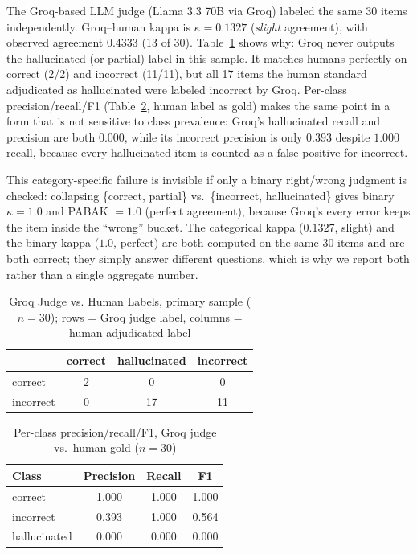 \documentclass[conference]{IEEEtran}
\begin{document}
The Groq-based LLM judge (Llama 3.3 70B via Groq) labeled the same 30 items independently. Groq--human kappa is $\kappa=0.1327$ (\emph{slight} agreement), with observed agreement $0.4333$ (13 of 30). Table~\ref{tab:confusion-groq30} shows why: Groq never outputs the hallucinated (or partial) label in this sample. It matches humans perfectly on correct (2/2) and incorrect (11/11), but all 17 items the human standard adjudicated as hallucinated were labeled incorrect by Groq. Per-class precision/recall/F1 (Table~\ref{tab:prf-groq30}, human label as gold) makes the same point in a form that is not sensitive to class prevalence: Groq's hallucinated recall and precision are both $0.000$, while its incorrect precision is only $0.393$ despite $1.000$ recall, because every hallucinated item is counted as a false positive for incorrect.

This category-specific failure is invisible if only a binary right/wrong judgment is checked: collapsing \{correct, partial\} vs.\ \{incorrect, hallucinated\} gives binary $\kappa=1.0$ and PABAK $=1.0$ (perfect agreement), because Groq's every error keeps the item inside the ``wrong'' bucket. The categorical kappa ($0.1327$, slight) and the binary kappa ($1.0$, perfect) are both computed on the same 30 items and are both correct; they simply answer different questions, which is why we report both rather than a single aggregate number.

\begin{table}[h]
\caption{Groq Judge vs. Human Labels, primary sample ($n=30$); rows = Groq judge label, columns = human adjudicated label}
\label{tab:confusion-groq30}
\centering
\begin{tabular}{lccc}
\hline
 & correct & hallucinated & incorrect \\
\hline
correct & 2 & 0 & 0 \\
incorrect & 0 & 17 & 11 \\
\hline
\end{tabular}
\end{table}

\begin{table}[h]
\caption{Per-class precision/recall/F1, Groq judge vs.\ human gold ($n=30$)}
\label{tab:prf-groq30}
\centering
\begin{tabular}{lccc}
\hline
Class & Precision & Recall & F1 \\
\hline
correct & 1.000 & 1.000 & 1.000 \\
incorrect & 0.393 & 1.000 & 0.564 \\
hallucinated & 0.000 & 0.000 & 0.000 \\
\hline
\end{tabular}
\end{table}
\end{document}
